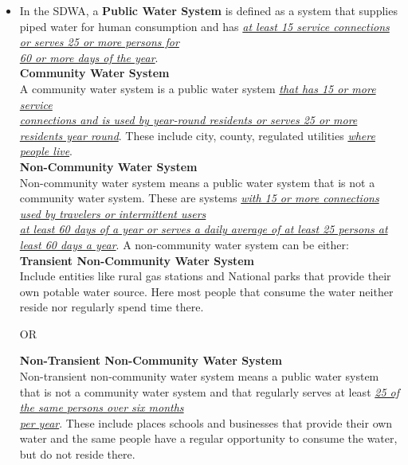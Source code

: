 \begin{itemize}
\item In the SDWA, a \textbf{Public Water System} is defined as a system that supplies piped water for human consumption and has \textsl{\underline{at least 15 service connections or serves 25 or more persons for}}\\
\textsl{\underline{60 or more days of the year}}.\\
\textbf{Community Water System}\\
A community water system  is a public water system \textsl{\underline{that has 15 or more service}}\\
\textsl{\underline{connections and is used by year-round residents or serves 25 or more residents year round}}.  These include city, county, regulated utilities \textsl{\underline{where people live}}.\\
\textbf{Non-Community Water System}  \\
Non-community water system means a public water system that is not a community water system. These are systems \textsl{\underline{with 15 or more connections used by travelers or intermittent users}}\\
\textsl{\underline{at least 60 days of a year or serves a daily average of at least 25 persons at least 60 days a year}}.
A non-community water system can be either:\\
\textbf{Transient Non-Community Water System} \\
Include entities like rural gas stations and National parks that provide their own potable water source.  Here most people that consume the water neither reside nor regularly spend time there.\\
\begin{center}
OR\\
\end{center}
\textbf{Non-Transient Non-Community Water System} \\
Non-transient non-community water system means a public water system that is not a community water system and that regularly serves at least \textsl{\underline{25 of the same persons over six months}}\\
\textsl{\underline{per year}}.  These include places schools and businesses that provide their own water and the same people have a regular opportunity to consume the water, but do not reside there.

\end{itemize}
